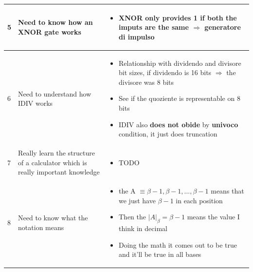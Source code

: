 \documentclass[a4paper,12pt]{article}
\begin{document}
    \begin{tabular}{|C{0.7cm}|C{8cm}|C{8cm}|}
        \hline



        5
        &
        Need to know how an XNOR gate works        
        &
        \begin{itemize}[label=\(\rightarrow\)]
            \item XNOR only provides 1 if both the imputs are the same $\Rightarrow$ generatore di impulso
        \end{itemize}
        \\
        \hline        


        6
        &
        Need to understand how IDIV works
        &
        \begin{itemize}[label=\(\rightarrow\)]
            \item Relationship with dividendo and divisore bit sizes, if dividendo is 16 bits $\Rightarrow$ the divisore was 8 bits
            \item See if the quoziente is representable on 8 bits 
            \item IDIV also \textbf{does not obide} by \textbf{univoco} condition, it just does truncation
        \end{itemize}
        \\
        \hline


        7
        &
        Really learn the structure of a calculator which is really important knowledge
        &
        \begin{itemize}[label=\(\rightarrow\)]
            \item TODO
        \end{itemize}

        \\
        \hline


        8
        &
        Need to know what the notation means
        &
        \begin{itemize}[label=\(\rightarrow\)]
            \item the A $\equiv \beta-1, \beta-1, ..., \beta-1 $ means that we just have $\beta-1$ in each position
            \item Then the $|A|_{\beta} = \beta-1$ means the value I think in decimal
            \item Doing the math it comes out to be true and it'll be true in all bases
        \end{itemize}

        \\
        \hline



\end{tabular}
\end{document}
